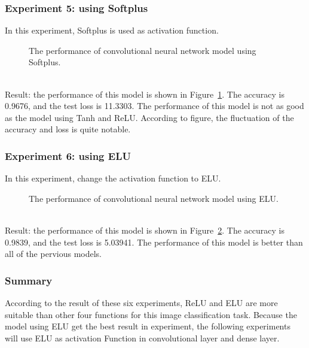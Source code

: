 \documentclass[]{UCD_CS_FYP_Report}
\begin{document}
\subsubsection{Experiment 5: using Softplus}
In this experiment, Softplus is used as activation function.
\begin{figure}[h]
\centering
\fboxsep 2mm
\caption{\label{fig:MNIST_CNN_S1E5} The performance of convolutional neural network model using Softplus.}
\end{figure}
\\Result: the performance of this model is shown in Figure~\ref{fig:MNIST_CNN_S1E5}. The accuracy is 0.9676, and the test loss is 11.3303. The performance of this model is not as good as the model using Tanh and ReLU. According to figure, the fluctuation of the accuracy and loss is quite notable.
%
\subsubsection{Experiment 6: using ELU}
In this experiment, change the activation function to ELU.
\begin{figure}[h]
\centering
\fboxsep 2mm
\caption{\label{fig:MNIST_CNN_S1E6} The performance of convolutional neural network model using ELU.}
\end{figure}
\\Result: the performance of this model is shown in Figure~\ref{fig:MNIST_CNN_S1E6}. The accuracy is 0.9839, and the test loss is 5.03941. The performance of this model is better than all of the pervious models. 
\subsubsection{Summary}
According to the result of these six experiments, ReLU and ELU are more suitable than other four functions for this image classification task. Because the model using ELU get the best result in experiment, the following experiments will use ELU as activation Function in convolutional layer and dense layer.
%
\end{document}
